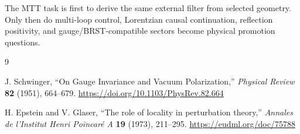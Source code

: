 \documentclass[11pt]{article}
\begin{document}
The MTT task is first to derive the same external filter from selected geometry.  Only then do
multi-loop control, Lorentzian causal continuation, reflection positivity, and
gauge/BRST-compatible sectors become physical promotion questions.

\begin{thebibliography}{9}

J. Schwinger,
``On Gauge Invariance and Vacuum Polarization,''
\emph{Physical Review} \textbf{82} (1951), 664--679.
\url{https://doi.org/10.1103/PhysRev.82.664}

H. Epstein and V. Glaser,
``The role of locality in perturbation theory,''
\emph{Annales de l'Institut Henri Poincar\'e A} \textbf{19} (1973), 211--295.
\url{https://eudml.org/doc/75788}

\end{thebibliography}
\end{document}
